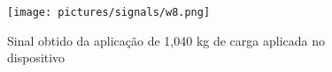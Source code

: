 %
%
%
%
%
%
%
%


\begin{figure}[H]
	\caption{\label{fig:4109} Sinal obtido da aplicação de 1,040 kg de carga aplicada no dispositivo}
	\begin{center}
		\texttt{[image: pictures/signals/w8.png]}
	\end{center}
\end{figure}


